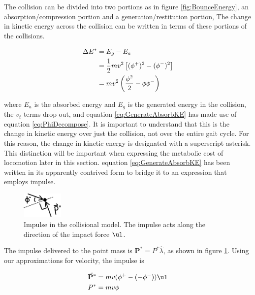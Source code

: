 The collision can be divided into two portions as in figure \ref{fig:BounceEnergy}, an absorption/compression portion and a generation/restitution portion, The change in kinetic energy across the collision can be written in terms of these portions of the collisions.

\begin{align}
\Delta E^{*} &= E_{g} - E_{a} \notag \\
  &= \frac{1}{2} m v^{2} \displaystyle\left[ (\phi^{+})^{2} - (\phi^{-})^{2} \displaystyle\right] \notag \\
 &= mv^{2} \left( \frac{\phi^2}{2} - \phi \phi^{-} \right)
\label{eq:GenerateAbsorbKE}
\end{align}

where $E_{a}$ is the absorbed energy and $E_{g}$ is the generated energy in the collision, the $v_{t}$ terms drop out, and equation \ref{eq:GenerateAbsorbKE} has made use of equation \ref{eq:PhiDecompose}. It is important to understand that this is the change in kinetic energy over just the collision, not over the entire gait cycle. For this reason, the change in kinetic energy is designated with a superscript asterisk. This distinction will be important when expressing the metabolic cost of locomotion later in this section. equation \ref{eq:GenerateAbsorbKE} has been written in its apparently contrived form to bridge it to an expression that employs impulse.

\begin{figure}[h]		%
\begin{centering}
\includegraphics[width=0.18\textwidth]{Figures/Impulse}\par
\end{centering}
\caption[Diagram: Impulse in the Collisional Model]{Impulse in the collisional model. The impulse acts along the direction of the impact force $\ul$.}
\label{fig:Impulse}
\end{figure}
%

The impulse delivered to the point mass is $\mathbf{P}^{*} = P^{*}\hat{\lambda}$, as shown in figure \ref{fig:Impulse}. Using our approximations for velocity, the impulse is

\begin{align}
\vec{\mathbf{P}}^* &= mv(\phi^{+} - (-\phi^{-}))\ul\\
P^* &= mv\phi
\label{eq:CollisionImpulse}
\end{align}

